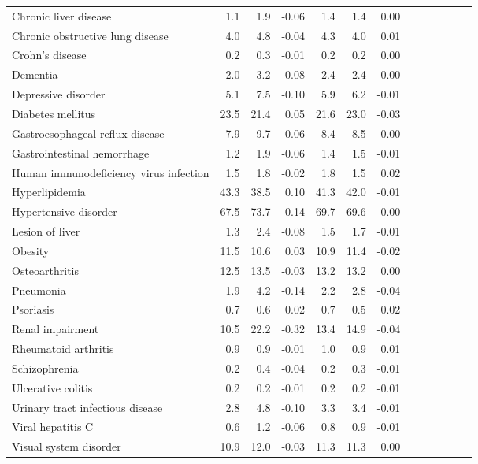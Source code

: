 \documentclass[11pt,]{article}
\begin{document}
\begin{longtable}{lrrrrrrrrrrrr}
      Chronic liver disease &  1.1 &  1.9 & -0.06 &  1.4 &  1.4 &  0.00 \\ 
      Chronic obstructive lung disease &  4.0 &  4.8 & -0.04 &  4.3 &  4.0 &  0.01 \\ 
      Crohn's disease &  0.2 &  0.3 & -0.01 &  0.2 &  0.2 &  0.00 \\ 
      Dementia &  2.0 &  3.2 & -0.08 &  2.4 &  2.4 &  0.00 \\ 
      Depressive disorder &  5.1 &  7.5 & -0.10 &  5.9 &  6.2 & -0.01 \\ 
      Diabetes mellitus & 23.5 & 21.4 &  0.05 & 21.6 & 23.0 & -0.03 \\ 
      Gastroesophageal reflux disease &  7.9 &  9.7 & -0.06 &  8.4 &  8.5 &  0.00 \\ 
      Gastrointestinal hemorrhage &  1.2 &  1.9 & -0.06 &  1.4 &  1.5 & -0.01 \\ 
      Human immunodeficiency virus infection &  1.5 &  1.8 & -0.02 &  1.8 &  1.5 &  0.02 \\ 
      Hyperlipidemia & 43.3 & 38.5 &  0.10 & 41.3 & 42.0 & -0.01 \\ 
      Hypertensive disorder & 67.5 & 73.7 & -0.14 & 69.7 & 69.6 &  0.00 \\ 
      Lesion of liver &  1.3 &  2.4 & -0.08 &  1.5 &  1.7 & -0.01 \\ 
      Obesity & 11.5 & 10.6 &  0.03 & 10.9 & 11.4 & -0.02 \\ 
      Osteoarthritis & 12.5 & 13.5 & -0.03 & 13.2 & 13.2 &  0.00 \\ 
      Pneumonia &  1.9 &  4.2 & -0.14 &  2.2 &  2.8 & -0.04 \\ 
      Psoriasis &  0.7 &  0.6 &  0.02 &  0.7 &  0.5 &  0.02 \\ 
      Renal impairment & 10.5 & 22.2 & -0.32 & 13.4 & 14.9 & -0.04 \\ 
      Rheumatoid arthritis &  0.9 &  0.9 & -0.01 &  1.0 &  0.9 &  0.01 \\ 
      Schizophrenia &  0.2 &  0.4 & -0.04 &  0.2 &  0.3 & -0.01 \\ 
      Ulcerative colitis &  0.2 &  0.2 & -0.01 &  0.2 &  0.2 & -0.01 \\ 
      Urinary tract infectious disease &  2.8 &  4.8 & -0.10 &  3.3 &  3.4 & -0.01 \\ 
      Viral hepatitis C &  0.6 &  1.2 & -0.06 &  0.8 &  0.9 & -0.01 \\ 
      Visual system disorder & 10.9 & 12.0 & -0.03 & 11.3 & 11.3 &  0.00 \\ 

\end{longtable}
\end{document}
